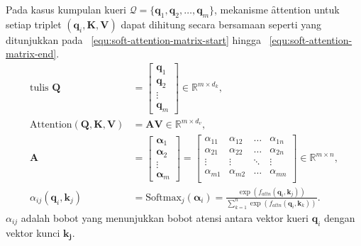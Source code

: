 	Pada kasus kumpulan kueri $\mathcal{Q} = \{\mathbf{q}_1, \mathbf{q}_2, \dots, \mathbf{q}_m\}$, mekanisme \f{attention} untuk setiap triplet $(\mathbf{q}_i, \mathbf{K}, \mathbf{V})$ dapat dihitung secara bersamaan seperti yang ditunjukkan pada \equ~\ref{equ:soft-attention-matrix-start} hingga \equ~\ref{equ:soft-attention-matrix-end}.
	\begin{align}
		\label{equ:soft-attention-matrix-start}
		\text{tulis }\mathbf{Q} &= \begin{bmatrix}
			\mathbf{q}_1 \\
			\mathbf{q}_2 \\
			\vdots \\
			\mathbf{q}_m
		\end{bmatrix} \in \mathbb{R}^{m \times d_k}, \\
		\text{Attention}(\mathbf{Q}, \mathbf{K}, \mathbf{V}) &= \mathbf{A} \mathbf{V} \in \mathbb{R}^{m \times d_v},\\
		\mathbf{A} &= \begin{bmatrix}
			\bm{\alpha}_1 \\
			\bm{\alpha}_2 \\
			\vdots \\
			\bm{\alpha}_m
		\end{bmatrix} = \begin{bmatrix}
			\alpha_{11} & \alpha_{12} & \dots & \alpha_{1n} \\
			\alpha_{21} & \alpha_{22} & \dots & \alpha_{2n} \\
			\vdots & \vdots & \ddots & \vdots \\
			\alpha_{m1} & \alpha_{m2} & \dots & \alpha_{mn} \\
		\end{bmatrix} \in \mathbb{R}^{m \times n}, \\
		\label{equ:soft-attention-matrix-end}
		\alpha_{ij}(\mathbf{q}_i, \mathbf{k}_j) &= \text{Softmax}_j(\mathbf{\alpha}_i) = \frac{\exp(f_{attn}(\mathbf{q}_i, \mathbf{k}_j))}{\sum_{k=1}^{n} \exp(f_{attn}(\mathbf{q}_i, \mathbf{k}_k))}.
	\end{align}
	$\alpha_{ij}$ adalah bobot yang menunjukkan bobot atensi antara vektor kueri $\mathbf{q}_i$ dengan vektor kunci $\mathbf{k_j}$. 

